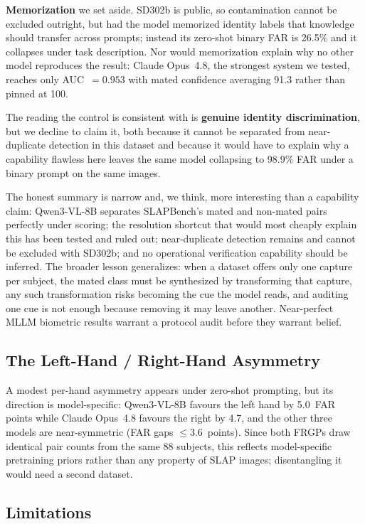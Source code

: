 \documentclass[runningheads]{llncs}
\begin{document}
\textbf{Memorization} we set aside. SD302b is public, so contamination cannot
be excluded outright, but had the model memorized identity labels that
knowledge should transfer across prompts; instead its zero-shot binary FAR is
26.5\% and it collapses under task description. Nor would memorization explain
why no other model reproduces the result: Claude Opus~4.8, the strongest
system we tested, reaches only AUC~$= 0.953$ with mated confidence averaging
91.3 rather than pinned at 100.

The reading the control is consistent with is \textbf{genuine identity
discrimination}, but we decline to claim it, both because it cannot be
separated from near-duplicate detection in this dataset and because it would
have to explain why a capability flawless here leaves the same model
collapsing to 98.9\% FAR under a binary prompt on the same images.

The honest summary is narrow and, we think, more interesting than a capability
claim: Qwen3-VL-8B separates SLAPBench's mated and non-mated pairs perfectly
under scoring; the resolution shortcut that would most cheaply explain this
has been tested and ruled out; near-duplicate detection remains and cannot be
excluded with SD302b; and no operational verification capability should be
inferred. The broader lesson generalizes: when a dataset offers only one
capture per subject, the mated class must be synthesized by transforming that
capture, any such transformation risks becoming the cue the model reads, and
auditing one cue is not enough because removing it may leave another.
Near-perfect MLLM biometric results warrant a protocol audit before they
warrant belief.

\subsection{The Left-Hand / Right-Hand Asymmetry}

A modest per-hand asymmetry appears under zero-shot prompting, but its
direction is model-specific: Qwen3-VL-8B favours the left hand by 5.0~FAR
points while Claude Opus~4.8 favours the right by 4.7, and the other three
models are near-symmetric (FAR gaps $\leq$3.6~points). Since both FRGPs draw
identical pair counts from the same 88 subjects, this reflects model-specific
pretraining priors rather than any property of SLAP images; disentangling it
would need a second dataset.

\subsection{Limitations}
\label{sec:limitations}
\end{document}
